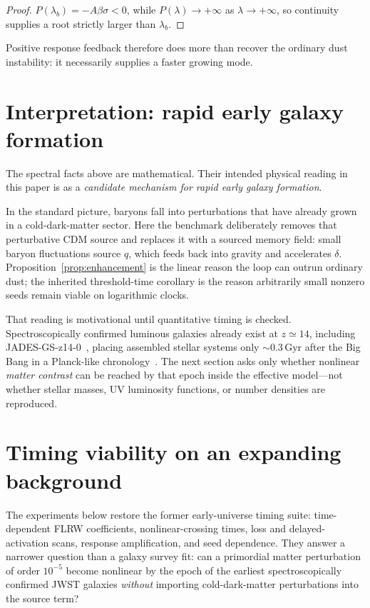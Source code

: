 \documentclass[11pt]{article}
\theoremstyle{definition}
\theoremstyle{remark}
\begin{document}
\begin{proof}
$P(\lambda_b)=-A\beta\sigma<0$, while $P(\lambda)\to+\infty$ as $\lambda\to+\infty$, so continuity supplies a root strictly larger than $\lambda_b$.
\end{proof}

Positive response feedback therefore does more than recover the ordinary dust instability: it necessarily supplies a faster growing mode.

\section{Interpretation: rapid early galaxy formation}
\label{sec:interpretation}
The spectral facts above are mathematical.
Their intended physical reading in this paper is as a \emph{candidate mechanism for rapid early galaxy formation}.

In the standard picture, baryons fall into perturbations that have already grown in a cold-dark-matter sector.
Here the benchmark deliberately removes that perturbative CDM source and replaces it with a sourced memory field: small baryon fluctuations source $q$, which feeds back into gravity and accelerates $\delta$.
Proposition~\ref{prop:enhancement} is the linear reason the loop can outrun ordinary dust; the inherited threshold-time corollary is the reason arbitrarily small nonzero seeds remain viable on logarithmic clocks.

That reading is motivational until quantitative timing is checked.
Spectroscopically confirmed luminous galaxies already exist at $z\simeq14$, including JADES-GS-z14-0~\cite{Carniani2024}, placing assembled stellar systems only $\sim0.3\,\mathrm{Gyr}$ after the Big Bang in a Planck-like chronology~\cite{Planck2018}.
The next section asks only whether nonlinear \emph{matter contrast} can be reached by that epoch inside the effective model---not whether stellar masses, UV luminosity functions, or number densities are reproduced.

\section{Timing viability on an expanding background}
\label{sec:timing}
The experiments below restore the former early-universe timing suite: time-dependent FLRW coefficients, nonlinear-crossing times, loss and delayed-activation scans, response amplification, and seed dependence.
They answer a narrower question than a galaxy survey fit: can a primordial matter perturbation of order $10^{-5}$ become nonlinear by the epoch of the earliest spectroscopically confirmed JWST galaxies \emph{without} importing cold-dark-matter perturbations into the source term?
\end{document}
